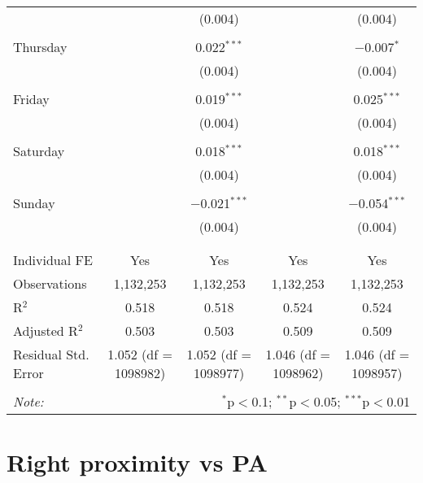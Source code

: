 \documentclass[
]{article}
\begin{document}
\begin{table}[!htbp]
{\begin{tabular}{@{\extracolsep{5pt}}lcccc}
  &  & (0.004) &  & (0.004) \\ 
  & & & & \\ 
 Thursday &  & 0.022$^{***}$ &  & $-$0.007$^{*}$ \\ 
  &  & (0.004) &  & (0.004) \\ 
  & & & & \\ 
 Friday &  & 0.019$^{***}$ &  & 0.025$^{***}$ \\ 
  &  & (0.004) &  & (0.004) \\ 
  & & & & \\ 
 Saturday &  & 0.018$^{***}$ &  & 0.018$^{***}$ \\ 
  &  & (0.004) &  & (0.004) \\ 
  & & & & \\ 
 Sunday &  & $-$0.021$^{***}$ &  & $-$0.054$^{***}$ \\ 
  &  & (0.004) &  & (0.004) \\ 
  & & & & \\ 
\hline \\[-1.8ex] 
Individual FE & Yes & Yes & Yes & Yes \\ 
Observations & 1,132,253 & 1,132,253 & 1,132,253 & 1,132,253 \\ 
R$^{2}$ & 0.518 & 0.518 & 0.524 & 0.524 \\ 
Adjusted R$^{2}$ & 0.503 & 0.503 & 0.509 & 0.509 \\ 
Residual Std. Error & 1.052 (df = 1098982) & 1.052 (df = 1098977) & 1.046 (df = 1098962) & 1.046 (df = 1098957) \\ 
\hline 
\hline \\[-1.8ex] 
\textit{Note:}  & \multicolumn{4}{r}{$^{*}$p$<$0.1; $^{**}$p$<$0.05; $^{***}$p$<$0.01} \\ 
\end{tabular}
} 
\end{table} 
\newpage
\section{Right proximity vs PA}
\end{document}
